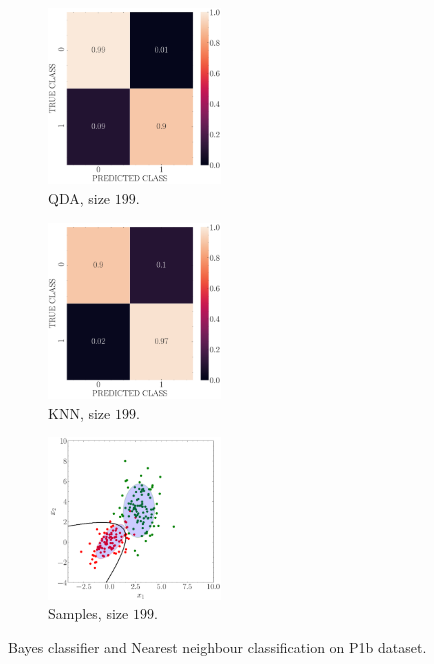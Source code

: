 \documentclass[12pt, a4 paper]{article}
\begin{document}
\begin{figure}[!htbp]
\quad \quad
    \begin{subfigure}[!htbp]{0.24\textwidth}
       \centering
       \includegraphics[width=1.8in]{../results/ex1/conf_mtx_QD_ML_dataset_P1b_size_199.pdf}
       \caption{QDA, size $199$.}
       \label{fig:KNN_P1b_199}
    \end{subfigure}
\quad \quad
    \begin{subfigure}[!htbp]{0.24\textwidth}
       \centering
       \includegraphics[width=1.8in]{../results/ex1/conf_mtx_KNN_dataset_P1b_size_199.pdf}
       \caption{KNN, size $199$.}
       \label{fig:KNN_P1b_199}
    \end{subfigure}
\quad \quad
    \begin{subfigure}[!htbp]{0.24\textwidth}
       \centering
       \includegraphics[width=1.8in]{../results/ex1/samples_QD_ML_dataset_P1b_size_199.pdf}
       \caption{Samples, size $199$.}
       \label{fig:KNN_P1b_199}
    \end{subfigure}

\caption{Bayes classifier and Nearest neighbour classification on P1b dataset.}
\label{fig:ex11P1b}
\end{figure}
\end{document}
